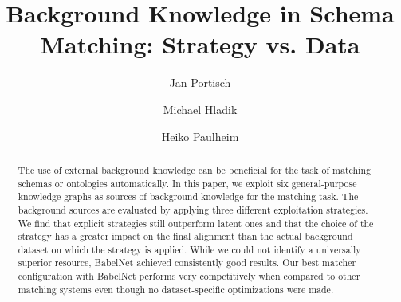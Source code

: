 \documentclass[runningheads]{llncs}
\begin{document}
%
\title{Background Knowledge in Schema Matching: Strategy vs. Data}


\author{Jan Portisch \and
Michael Hladik \and
Heiko Paulheim}
%



%
\maketitle
%
\begin{abstract}
The use of external background knowledge can be beneficial for the task of matching schemas or ontologies automatically. In this paper, we exploit six general-purpose knowledge graphs as sources of background knowledge for the matching task. The background sources are evaluated by applying three different exploitation strategies. 
We find that explicit strategies still outperform latent ones and that the choice of the strategy has a greater impact on the final alignment than the actual background dataset on which the strategy is applied. While we could not identify a universally superior resource, BabelNet achieved consistently good results.
Our best matcher configuration with BabelNet performs very competitively when compared to other matching systems even though no dataset-specific optimizations were made.

\end{abstract}
%
\end{document}

